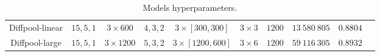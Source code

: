 \documentclass[switch, 12pt]{article}
\begin{document}
\begin{table}[H]
\begin{center}
{\begin{tabular}{|c|c|c|c|c|c|c|c|c|c|}
                Diffpool-linear     & $15, 5, 1 $              & $3 \times 600$                      & $4, 3, 2$    & $3\times [300, 300]$                     & $3\times 3$                           & $1200$                      & $13\:580\:805$            & $0.8804$                  \\
                Diffpool-large      & $15, 5, 1 $              & $3 \times 1200$                     & $5, 3, 2$    & $3\times [1200, 600]$                    & $3\times 6$                           & $1200$                      & $59\:116\:305$            & $0.8932$                  \\
                \midrule
            \end{tabular}
        }
    \end{center}
    \label{tab:models}
    \caption{Models hyperparameters.}
\end{table}
\end{document}
